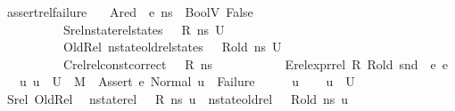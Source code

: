 \begin{isabellebody}
\ assert{\isacharunderscore}{\kern0pt}rel{\isacharunderscore}{\kern0pt}failure{\isacharcolon}{\kern0pt}\isanewline
\ \ \ Ared{\isacharcolon}{\kern0pt}{\isachardoublequoteopen}{\isasymLambda}{\isacharcomma}{\kern0pt}{\isasymGamma}{\isacharcomma}{\kern0pt}{\isasymOmega}\ {\isasymturnstile}\ {\isasymlangle}e{}{\isacharcomma}{\kern0pt}\ ns{\isasymrangle}\ {\isasymDown}\ {\isacharparenleft}{\kern0pt}BoolV\ False{\isacharparenright}{\kern0pt}{\isachardoublequoteclose}\ \isanewline
\ \ \ \ \ \ \ \ \ \ Srel{\isacharcolon}{\kern0pt}{\isachardoublequoteopen}nstate{\isacharunderscore}{\kern0pt}rel{\isacharunderscore}{\kern0pt}states\ {\isasymLambda}\ {\isasymLambda}{\isacharprime}{\kern0pt}\ R\ ns\ U{\isachardoublequoteclose}\ \isanewline
\ \ \ \ \ \ \ \ \ \ OldRel{\isacharcolon}{\kern0pt}\ {\isachardoublequoteopen}nstate{\isacharunderscore}{\kern0pt}old{\isacharunderscore}{\kern0pt}rel{\isacharunderscore}{\kern0pt}states\ {\isasymLambda}\ {\isasymLambda}{\isacharprime}{\kern0pt}\ R{\isacharunderscore}{\kern0pt}old\ ns\ U{\isachardoublequoteclose}\ \isanewline
\ \ \ \ \ \ \ \ \ \ Crel{\isacharcolon}{\kern0pt}{\isachardoublequoteopen}rel{\isacharunderscore}{\kern0pt}const{\isacharunderscore}{\kern0pt}correct\ {\isasymLambda}\ {\isasymOmega}\ R\ ns{\isachardoublequoteclose}\ \isanewline
\ \ \ \ \ \ \ \ \ \ Erel{\isacharcolon}{\kern0pt}{\isachardoublequoteopen}expr{\isacharunderscore}{\kern0pt}rel\ R\ R{\isacharunderscore}{\kern0pt}old\ {\isacharparenleft}{\kern0pt}snd\ {\isasymLambda}{\isacharparenright}{\kern0pt}\ e{}\ e{}{\isachardoublequoteclose}\isanewline
\ \ \ {\isachardoublequoteopen}{\isasymAnd}u{\isachardot}{\kern0pt}\ u\ {\isasymin}\ U\ {\isasymLongrightarrow}\ M{\isacharcomma}{\kern0pt}{\isasymLambda}{\isacharprime}{\kern0pt}{\isacharcomma}{\kern0pt}{\isasymGamma}{\isacharcomma}{\kern0pt}{\isasymOmega}\ {\isasymturnstile}\ {\isasymlangle}Assert\ e{}{\isacharcomma}{\kern0pt}\ Normal\ u{\isasymrangle}\ {\isasymrightarrow}\ Failure{\isachardoublequoteclose}\isanewline
%
\isadelimproof
%
\endisadelimproof
%
\isatagproof
{}\isamarkupfalse%
\ {\isacharminus}{\kern0pt}\isanewline
\ \ \isamarkupfalse%
\ u\isanewline
\ \ \isamarkupfalse%
\ {\isachardoublequoteopen}u\ {\isasymin}\ U{\isachardoublequoteclose}\isanewline
\ \ \isamarkupfalse%
\ Srel\ OldRel\ \isamarkupfalse%
\ {\isachardoublequoteopen}nstate{\isacharunderscore}{\kern0pt}rel\ {\isasymLambda}\ {\isasymLambda}{\isacharprime}{\kern0pt}\ R\ ns\ u{\isachardoublequoteclose}\ \ {\isachardoublequoteopen}nstate{\isacharunderscore}{\kern0pt}old{\isacharunderscore}{\kern0pt}rel\ {\isasymLambda}\ {\isasymLambda}{\isacharprime}{\kern0pt}\ R{\isacharunderscore}{\kern0pt}old\ ns\ u{\isachardoublequoteclose}\ \ \ \ \isanewline

\end{isabellebody}
